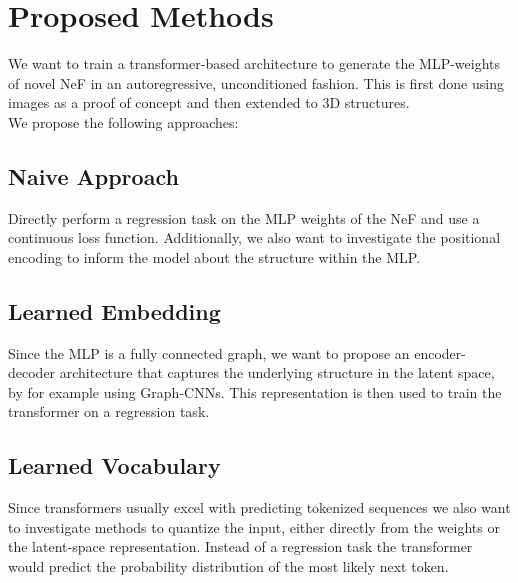 \section{Proposed Methods}
\label{sec:method}
We want to train a transformer-based architecture to generate the MLP-weights of novel
NeF in an autoregressive, unconditioned fashion. This is first done using images as a
proof of concept and then extended to 3D structures.\\

\noindent We propose the following approaches:
\subsection*{Naive Approach}
Directly perform a regression task on the MLP weights of the NeF and use a continuous loss function.
Additionally, we also want to investigate the positional encoding to inform the model about the structure within the MLP.
\subsection*{Learned Embedding}
Since the MLP is a fully connected graph, we want to propose an encoder-decoder architecture that captures the underlying structure in the latent space, by for example using Graph-CNNs. This representation is then used to train the transformer on a regression task.
\subsection*{Learned Vocabulary}
Since transformers usually excel with predicting tokenized sequences we also want to investigate methods to quantize the input, either directly from the weights or the latent-space representation. Instead of a regression task the transformer would predict the probability distribution of the most likely next token.
